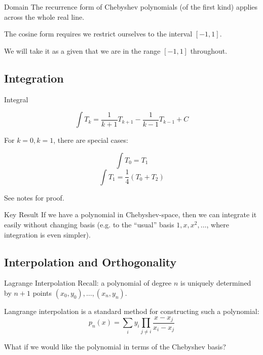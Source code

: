 \documentclass[pdf]{beamer}
\begin{document}
\begin{frame}{Domain}
  The recurrence form of Chebyshev polynomials (of the first kind) applies
  across the whole real line.\newline

  The cosine form requires we restrict ourselves to the interval $[-1,1]$.\newline

  We will take it as a given that we are in the range $[-1,1]$ throughout.
\end{frame}

\subsection{Integration}

\begin{frame}{Integral}
  \begin{center}
    \[ \int T_k = \frac{1}{k+1} T_{k+1} - \frac{1}{k-1} T_{k-1} + C\]
  \end{center}
  For $k=0, k=1$, there are special cases:

  \begin{center}
    \[ \int T_0 = T_1 \]
    \[ \int T_1 =  \frac{1}{4}(T_0 + T_2) \]
  \end{center}


  See notes for proof.
\end{frame}


\begin{frame}{Key Result}
  If we have a polynomial in Chebyshev-space, then we can integrate it easily
  without changing basis (e.g. to the ``usual'' basis $1, x, x^2,\ldots$, where
  integration is even simpler).
\end{frame}

\subsection{Interpolation and Orthogonality}

\begin{frame}{Lagrange Interpolation}
  Recall: a polynomial of degree $n$ is uniquely determined by $n+1$ points $(x_0, y_0),\ldots,(x_n, y_n)$.\newline

  Langrange interpolation is a standard method for constructing such a polynomial:
  \[ p_n(x) = \sum_i y_i \prod_{j \neq i} \frac{x - x_j}{x_i - x_j} \]

  What if we would like the polynomial in terms of the Chebyshev basis?
\end{frame}
\end{document}
